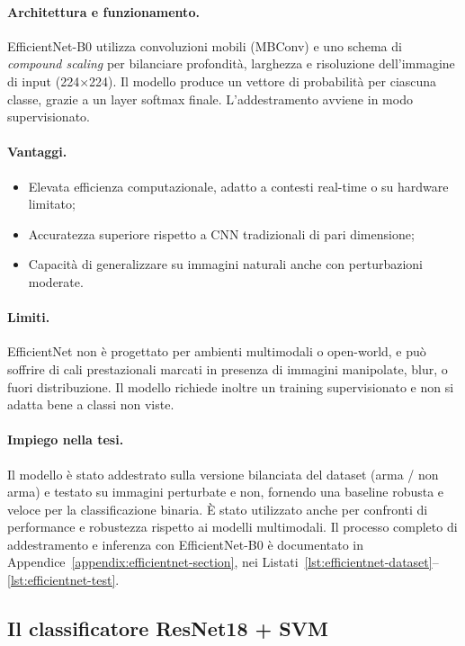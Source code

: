 \paragraph{Architettura e funzionamento.} EfficientNet-B0 utilizza convoluzioni mobili (MBConv) e uno schema di \textit{compound scaling} per bilanciare profondità, larghezza e risoluzione dell’immagine di input (224×224). Il modello produce un vettore di probabilità per ciascuna classe, grazie a un layer softmax finale. L’addestramento avviene in modo supervisionato.

\paragraph{Vantaggi.}
\begin{itemize}
\item Elevata efficienza computazionale, adatto a contesti real-time o su hardware limitato;
\item Accuratezza superiore rispetto a CNN tradizionali di pari dimensione;
\item Capacità di generalizzare su immagini naturali anche con perturbazioni moderate.
\end{itemize}

\paragraph{Limiti.} EfficientNet non è progettato per ambienti multimodali o open-world, e può soffrire di cali prestazionali marcati in presenza di immagini manipolate, blur, o fuori distribuzione. Il modello richiede inoltre un training supervisionato e non si adatta bene a classi non viste.

\paragraph{Impiego nella tesi.} Il modello è stato addestrato sulla versione bilanciata del dataset (arma / non arma) e testato su immagini perturbate e non, fornendo una baseline robusta e veloce per la classificazione binaria. È stato utilizzato anche per confronti di performance e robustezza rispetto ai modelli multimodali.
Il processo completo di addestramento e inferenza con EfficientNet-B0 è documentato in Appendice~\ref{appendix:efficientnet-section}, nei Listati~\ref{lst:efficientnet-dataset}–\ref{lst:efficientnet-test}.


\subsection*{Il classificatore ResNet18 + SVM}
\label{sec:resnet18-svm-model}

